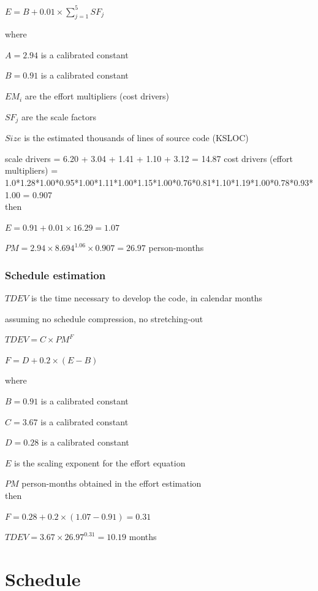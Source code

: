 \documentclass[english]{article}
\begin{document}
\begin{center}
$ E = B + 0.01 \times \sum_{j=1}^{5} SF_j $
\end{center}
where

$ A = 2.94 $ is a calibrated constant 

$ B = 0.91 $ is a calibrated constant

$EM_i$ are the effort multipliers (cost drivers)

$SF_j$ are the scale factors

$Size$ is the estimated thousands of lines of source code (KSLOC)


scale drivers = 6.20 + 3.04 + 1.41 + 1.10 + 3.12 = 14.87
cost drivers (effort multipliers) = 1.0*1.28*1.00*0.95*1.00*1.11*1.00*1.15*1.00*0.76*0.81*1.10*1.19*1.00*0.78*0.93*1.00 = 0.907\\
then

$E = 0.91 + 0.01 \times 16.29 = 1.07$

$PM = 2.94 \times 8.694^{1.06} \times 0.907 = 26.97$ person-months

\subsubsection{Schedule estimation}

$TDEV$ is the time necessary to develop the code, in calendar months

assuming no schedule compression, no stretching-out

\begin{center}
	$TDEV = C \times PM^F$
\end{center}

\begin{center}
	$F = D + 0.2 \times (E-B)$
\end{center}
where

$B = 0.91$ is a calibrated constant

$C = 3.67$ is a calibrated constant

$D = 0.28$ is a calibrated constant

$E$ is the scaling exponent for the effort equation

$PM$ person-months obtained in the effort estimation\\
then

$F = 0.28 + 0.2 \times (1.07 - 0.91) = 0.31$

$TDEV = 3.67 \times 26.97^{0.31} = 10.19$ months

\section{Schedule}
\end{document}
